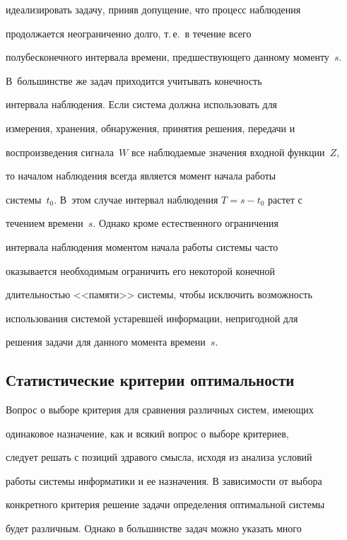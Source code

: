 идеализировать задачу, приняв допущение, что процесс наблюдения


продолжается неограниченно долго, т.\,е.\ в течение всего


полубесконечного интервала времени, предшествующего данному моменту~$s$. 


В~большинстве же задач приходится учитывать конечность


интервала наблюдения. Если система должна использовать для


измерения, хранения, обнаружения, принятия решения,  передачи и


воспроизведения сигнала~$W$ все наблюдаемые значения входной функции~$Z$, 


то началом наблюдения всегда является момент начала работы


сис\-те\-мы~$t_0$. В~этом случае интервал наблюдения  $T=s-t_0$ растет с


течением времени~$s$. Однако кроме естественного ограничения


интервала наблюдения моментом начала работы системы часто


оказывается необходимым ограничить его некоторой  конечной


длительностью <<памяти>> системы, чтобы исключить возможность


использования системой устаревшей информации, непригодной для


решения задачи для данного момента времени~$s$.





\subsection{Статистические критерии оптимальности}





 Вопрос о выборе критерия для сравнения различных систем, имеющих


одинаковое назначение, как и всякий вопрос о выборе критериев,


следует решать с позиций здравого смысла, исходя из анализа условий


работы системы информатики и ее назначения. В зависимости от выбора


конкретного критерия решение задачи определения оптимальной системы


будет различным.  Однако в большинстве задач можно указать много


